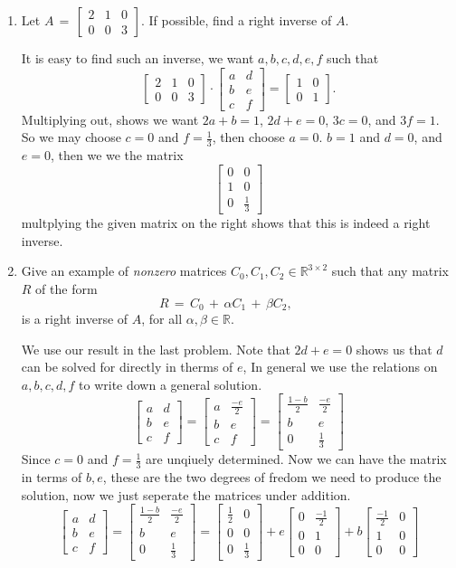 \documentclass[11pt,table]{article}
\newcommand {\mat}  [1] {\left[\begin{array}{#1}}
\newcommand {\rix}      {\end{array}\right]}
\newcommand{\<}				{\langle}
\renewcommand{\>}      		{\rangle}
\newcommand{\bR}{\mathbb{R}}
\begin{document}
\begin{enumerate}
\begin{enumerate}
	\item Let $
		A 
		\, = \, 
		\mat{rrr}
			2 & 1 & 0 \\
			0 & 0 & 3 
		\rix
	$. 
	If possible, find a right inverse of $A$.	


	It is easy to find such an inverse, we want $a, b, c, d, e, f$ such that 
	\[\mat{rrr} 2 & 1 & 0 \\ 0 & 0 & 3 \rix \cdot \mat{rr} a & d \\ b & e \\ c & f \rix = \mat{rr} 1 & 0 \\ 0 & 1 \rix. \]
	Multiplying out, shows we want $2a + b = 1$, $2d + e = 0$, $3c = 0$, and $3f = 1$. So we may choose $c = 0$ and $f = \frac{1}{3}$, 
	then choose $a = 0$. $b = 1$ and $d = 0$, and $e = 0$, then we we the matrix 
	\[\mat{rr} 0 & 0 \\ 1 & 0 \\ 0 & \frac{1}{3} \rix\]
	multplying the given matrix on the right shows that this is indeed a right inverse.

	
	\bigskip
	


	\item Give an example of {\em nonzero} matrices $C_0, C_1, C_2 \in \bR^{3 \times2}$ 
	such that any matrix $R$ of the form 
	\[
		R \, = \, 
		C_0 
		\, + \, 
		\alpha C_1 
		\, + \, 
		\beta C_2 , \qquad 
	\]
	is a right inverse of $A$, for all $\alpha, \beta \in \bR$.
	

	We use our result in the last problem. Note that $2d + e = 0$ shows us that $d$ can be solved for directly in therms of $e$, In general we use the relations on $a, b, c, d, f$ to write down a general solution.
	\[\mat{rr} a & d \\ b & e \\ c & f \rix = \mat{rr} a & \frac{-e}{2} \\ b & e \\ c & f \rix = \mat{rr} \frac{1 - b}{2} & \frac{-e}{2} \\ b & e \\ 0 & \frac{1}{3} \rix\]
	Since $c = 0 $ and $f = \frac{1}{3}$ are unqiuely determined. Now we can have the matrix in terms of $b, e$, these are the two degrees of fredom we need to produce the solution, now we just seperate the matrices under addition. 
	\[\mat{rr} a & d \\ b & e \\ c & f \rix = \mat{rr} \frac{1 - b}{2} & \frac{-e}{2} \\ b & e \\ 0 & \frac{1}{3} \rix = \mat{rr} \frac{1}{2} & 0\\ 0 & 0\\ 0 & \frac{1}{3} \rix + e \mat{rr} 0 & \frac{-1}{2} \\ 0 & 1 \\ 0 & 0 \rix + b\mat{rr} \frac{-1}{2}&0 \\1 & 0 \\ 0 & 0 \rix\]
\end{enumerate}



\end{enumerate}
\end{document}
